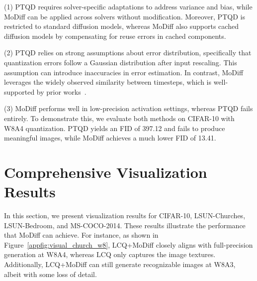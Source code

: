 (1) PTQD requires solver-specific adaptations to address variance and bias, while MoDiff can be applied across solvers without modification. Moreover, PTQD is restricted to standard diffusion models, whereas MoDiff also supports cached diffusion models by compensating for reuse errors in cached components.

(2) PTQD relies on strong assumptions about error distribution, specifically that quantization errors follow a Gaussian distribution after input rescaling. This assumption can introduce inaccuracies in error estimation. In contrast, MoDiff leverages the widely observed similarity between timesteps, which is well-supported by prior works~\citep{ma2024deepcache}.

(3) MoDiff performs well in low-precision activation settings, whereas PTQD fails entirely. To demonstrate this, we evaluate both methods on CIFAR-10 with W8A4 quantization. PTQD yields an FID of 397.12 and fails to produce meaningful images, while MoDiff achieves a much lower FID of 13.41.

\section{Comprehensive Visualization Results}
\label{app:visualize}
In this section, we present visualization results for CIFAR-10, LSUN-Churches, LSUN-Bedroom, and MS-COCO-2014. These results illustrate the performance that MoDiff can achieve. For instance, as shown in Figure~\ref{appfig:visual_church_w8}, LCQ+MoDiff closely aligns with full-precision generation at W8A4, whereas LCQ only captures the image textures. Additionally, LCQ+MoDiff can still generate recognizable images at W8A3, albeit with some loss of detail. 

